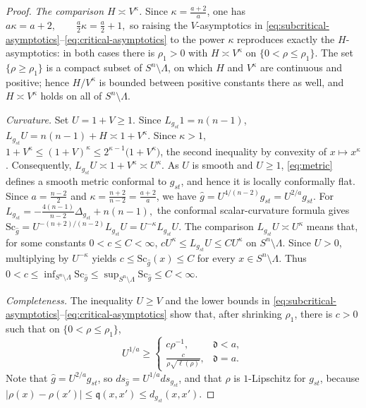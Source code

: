 \documentclass[12pt,oneside,a4paper]{article}
\theoremstyle{mytheorem}
\theoremstyle{remark}
\theoremstyle{definition}
\begin{document}
\begin{proof}
\emph{The comparison $H\asymp V^\kappa$.}  Since
$\kappa=\frac{a+2}a$, one has
$a\kappa=a+2,\qquad \frac a2\kappa=\frac a2+1,$
so raising the $V$-asymptotics in
\eqref{eq:subcritical-asymptotics}--\eqref{eq:critical-asymptotics} to
the power $\kappa$ reproduces exactly the $H$-asymptotics: in both
cases there is $\rho_1>0$ with $H\asymp V^\kappa$ on
$\{0<\rho\le\rho_1\}$.  The set $\{\rho\ge\rho_1\}$ is a compact
subset of $S^n\setminus\Lambda$, on which $H$ and $V^\kappa$ are
continuous and positive; hence $H/V^\kappa$ is bounded between
positive constants there as well, and $H\asymp V^\kappa$ holds on all
of $S^n\setminus\Lambda$.

\emph{Curvature.}  Set $U=1+V\ge1$.  Since $L_{g_{st}}1=n(n-1)$,
\(L_{g_{st}}U=n(n-1)+H\asymp1+V^\kappa\).
Since $\kappa>1$,
\(1+V^\kappa\le(1+V)^\kappa\le2^{\kappa-1}\bigl(1+V^\kappa\bigr)\),
the second inequality by convexity of $x\mapsto x^\kappa$.
Consequently,
\(L_{g_{st}}U\asymp1+V^\kappa\asymp U^\kappa\).
As $U$ is smooth and $U\ge1$, \eqref{eq:metric} defines a smooth
metric conformal to $g_{st}$, and hence it is locally conformally flat.
Since $a=\frac{n-2}{2}$ and
$\kappa=\frac{n+2}{n-2}=\frac{a+2}{a}$,
we have $\widehat g=U^{4/(n-2)}g_{st}=U^{2/a}g_{st}$.
For
$L_{g_{st}}
=-\frac{4(n-1)}{n-2}\Delta_{g_{st}}+n(n-1),$
the conformal scalar-curvature formula gives
\(\mathrm{Sc}_{\widehat g}
=U^{-(n+2)/(n-2)}L_{g_{st}}U
=U^{-\kappa}L_{g_{st}}U\).
The comparison $L_{g_{st}}U\asymp U^\kappa$ means that, for some
constants $0<c\le C<\infty$,
\(cU^\kappa\le L_{g_{st}}U\le CU^\kappa\)
on \(S^n\setminus\Lambda\).
Since $U>0$, multiplying by $U^{-\kappa}$ yields
$c\le\mathrm{Sc}_{\widehat g}(x)\le C$ for every
$x\in S^n\setminus\Lambda$.  Thus
\(0<c\leq
\inf_{S^n\setminus\Lambda}\mathrm{Sc}_{\widehat g}
\le \sup_{S^n\setminus\Lambda}\mathrm{Sc}_{\widehat g}
\leq C<\infty\).


\emph{Completeness.}  The inequality $U\ge V$ and the lower bounds in
\eqref{eq:subcritical-asymptotics}--\eqref{eq:critical-asymptotics} show that,
after shrinking $\rho_1$, there is $c>0$ such that on
$\{0<\rho\le\rho_1\}$,
\[
 U^{1/a}\ge
 \begin{cases}
  c\rho^{-1},&\mathfrak d<a,\\[1mm]
  \displaystyle\frac{c}{\rho\sqrt{\ell(\rho)}},&\mathfrak d=a.
 \end{cases}
\]
Note that $\widehat g=U^{2/a}g_{st}$, so
$ds_{\widehat g}=U^{1/a}ds_{g_{st}}$, and that $\rho$ is
$1$-Lipschitz for $g_{st}$, because
$|\rho(x)-\rho(x')|\le \mathfrak q(x,x')\le d_{g_{st}}(x,x')$.


\end{proof}
\end{document}
